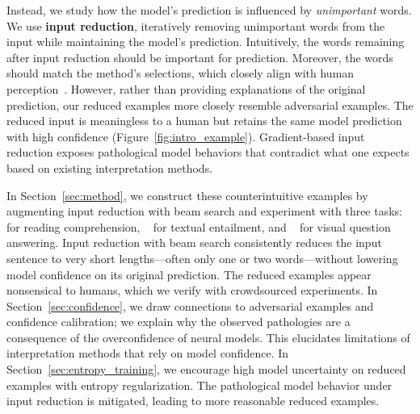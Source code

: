 Instead, we study how the model's prediction is influenced by 
\emph{unimportant} words.  We use \textbf{input reduction}, iteratively removing unimportant words from the input while maintaining the
model's prediction.  Intuitively, the words remaining after input reduction should
be important for prediction.  Moreover, the words should match the \loo{}
method's selections, which closely align with human
perception~\cite{li2016understanding,murdoch2018cd}.  However, rather than
providing explanations of the original prediction, our reduced examples more
closely resemble adversarial examples. The
reduced input is meaningless to a human but retains the same model prediction
with high confidence (Figure~\ref{fig:intro_example}). Gradient-based input reduction exposes pathological model
behaviors that contradict what one expects based on existing interpretation
methods.

In Section~\ref{sec:method}, we construct these counterintuitive
examples by augmenting input reduction with beam search and experiment
with three tasks: \squad~\cite{rajpurkar2016squad} for reading
comprehension, \snli~\cite{bowman2015snli} for textual entailment, and
\vqa~\cite{antol2015vqa} for visual question answering.  Input
reduction with beam search consistently reduces the input sentence to
very short lengths---often only one or two words---without lowering
model confidence on its original prediction.  The reduced examples
appear nonsensical to humans, which we verify with crowdsourced
experiments. In Section~\ref{sec:confidence}, we draw connections to
adversarial examples and confidence calibration; we explain why the
observed pathologies are a consequence of the overconfidence of neural
models. This elucidates limitations of interpretation methods that
rely on model confidence. In Section~\ref{sec:entropy_training}, we
encourage high model uncertainty on reduced examples with entropy
regularization. The pathological model behavior under input reduction
is mitigated, leading to more reasonable reduced examples.
